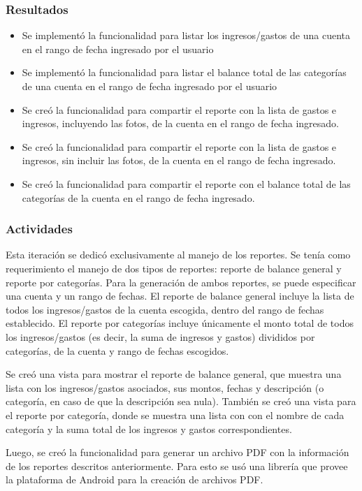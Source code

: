 \subsubsection{Resultados}
\begin{itemize}
\item Se implementó la funcionalidad para listar los ingresos/gastos de una cuenta en el rango de fecha ingresado por el usuario
\item Se implementó la funcionalidad para listar el balance total de las categorías de una cuenta en el rango de fecha ingresado por el usuario
\item Se creó la funcionalidad para compartir el reporte con la lista de gastos e ingresos, incluyendo las fotos, de la cuenta en el rango de fecha ingresado.
\item Se creó la funcionalidad para compartir el reporte con la lista de gastos e ingresos, sin incluir las fotos, de la cuenta en el rango de fecha ingresado.
\item Se creó la funcionalidad para compartir el reporte con el balance total de las categorías de la cuenta en el rango de fecha ingresado.
\end{itemize}

\subsubsection{Actividades}
Esta iteración se dedicó exclusivamente al manejo de los reportes. Se tenía como requerimiento el manejo de dos tipos de reportes: reporte de balance general y reporte por categorías. Para la generación de ambos reportes, se puede especificar una cuenta y un rango de fechas. El reporte de balance general incluye la lista de todos los ingresos/gastos de la cuenta escogida, dentro del rango de fechas establecido. El reporte por categorías incluye únicamente el monto total de todos los ingresos/gastos (es decir, la suma de ingresos y gastos) divididos por categorías, de la cuenta y rango de fechas escogidos.

Se creó una vista para mostrar el reporte de balance general, que muestra una lista con los ingresos/gastos asociados, sus montos, fechas y descripción (o categoría, en caso de que la descripción sea nula). También se creó una vista para el reporte por categoría, donde se muestra una lista con con el nombre de cada categoría y la suma total de los ingresos y gastos correspondientes. 

Luego, se creó la funcionalidad para generar un archivo PDF con la información de los reportes descritos anteriormente. Para esto se usó una librería que provee la plataforma de Android para la creación de archivos PDF.  

